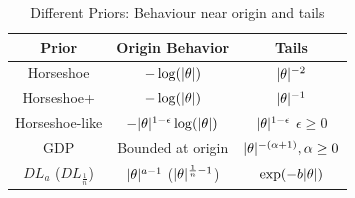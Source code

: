 \documentclass[11pt]{article}
\begin{document}
\begin{table}%
\centering
\begin{tabular}{| c | c |c |}
\hline
Prior & Origin Behavior & Tails \\
\hline 
Horseshoe & $-\log(\lvert\theta\rvert)$ & $\lvert\theta\rvert^{-2}$ \\
Horseshoe+ & $-\log(\lvert\theta\rvert)$ & $\lvert\theta\rvert^{-1}$ \\
Horseshoe-like & $-\lvert\theta\rvert^{1-\epsilon}\log(\lvert\theta\rvert)$ & $\lvert\theta\rvert^{1-\epsilon}$ $\epsilon \ge 0$\\
GDP & Bounded at origin & $\lvert\theta\rvert^{-(\alpha + 1)}, \alpha \ge 0$ \\
$DL_{a}$ ($DL_{\frac{1}{n}}$) & $\lvert\theta\rvert^{a-1}$ ($\lvert\theta\rvert^{\frac{1}{n}-1}$) & $\exp(-b\lvert\theta\rvert)$ \\
\hline
\end{tabular}
\caption{Different Priors: Behaviour near origin and tails}
\label{tab:priors}
\end{table}
\end{document}

